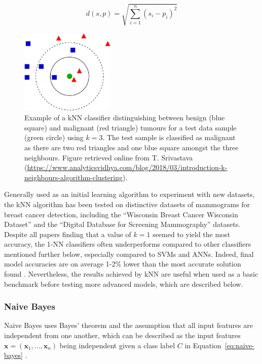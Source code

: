 \begin{equation}
\label{eq:euclidian-distance}
    d(s,p)=\sqrt{\sum_{i=1}^{n}(s_i-p_i)^2}
\end{equation}

\begin{figure}[h]
\centerline{\includegraphics[width=0.4\textwidth]{Dissertation/figures/litsurvey/knn.png}}
\caption{\label{fig:litsurvey-knn-example}Example of a kNN classifier distinguishing between benign (blue square) and malignant (red triangle) tumours for a test data sample (green circle) using $k=3$. The test sample is classified as malignant as there are two red triangles and one blue square amongst the three neighbours. Figure retrieved online from T. Srivastava (\url{https://www.analyticsvidhya.com/blog/2018/03/introduction-k-neighbours-algorithm-clustering}).}
\end{figure}

Generally used as an initial learning algorithm to experiment with new datasets, the kNN algorithm has been tested on distinctive datasets of mammograms for breast cancer detection, including the ``Wisconsin Breast Cancer Wisconsin Dataset'' \cite{Wolberg1995} and the ``Digital Database for Screening Mammography'' \cite{DDSMdataset2001} datasets. Despite all papers finding that a value of $k=1$ seemed to yield the most accuracy, the 1-NN classifiers often underperforms compared to other classifiers mentioned further below, especially compared to SVMs and ANNs. Indeed, final model accuracies are on average 1-2\% lower than the most accurate solution found \cite{Yue2018} \cite{Asri2016} \cite{Montazeri2016}. Nevertheless, the results achieved by kNN are useful when used as a basic benchmark before testing more advanced models, which are described below.

\subsubsection{Naive Bayes}

Naive Bayes uses Bayes' theorem and the assumption that all input features are independent from one another, which can be described as the input features $\textbf{x}=(\textbf{x}_1, ..., \textbf{x}_n)$ being independent given a class label $C$ in Equation~\ref{eq:naive-bayes} \cite{rish2001empirical}.


